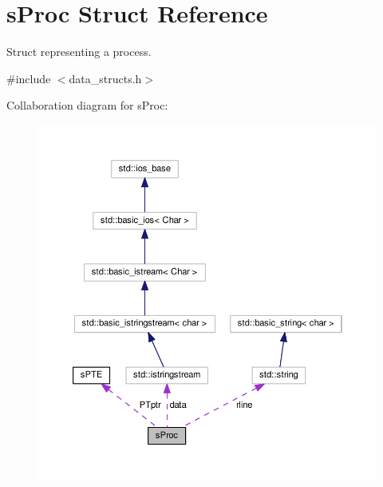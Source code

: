 \hypertarget{structsProc}{\section{s\-Proc \-Struct \-Reference}
\label{d4/d8e/structsProc}
}


\-Struct representing a process.  




{\ttfamily \#include $<$data\-\_\-structs.\-h$>$}



\-Collaboration diagram for s\-Proc\-:\nopagebreak
\begin{figure}[H]
\begin{center}
\leavevmode
\includegraphics[width=350pt]{df/dc9/structsProc__coll__graph}
\end{center}
\end{figure}
